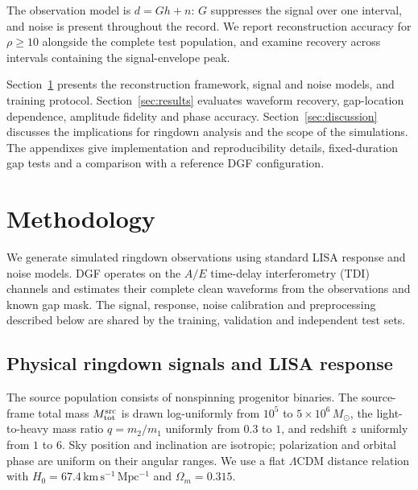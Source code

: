 \documentclass[10pt,prd,aps,a4paper,twocolumn,superscriptaddress,nofootinbib,floatfix]{revtex4-2}
\begin{document}
The observation model is $d=Gh+n$: $G$ suppresses the signal over one interval, and noise is present throughout the record. We report reconstruction accuracy for $\rho\ge10$ alongside the complete test population, and examine recovery across intervals containing the signal-envelope peak.

Section~\ref{sec:method} presents the reconstruction framework, signal and noise models, and training protocol. Section~\ref{sec:results} evaluates waveform recovery, gap-location dependence, amplitude fidelity and phase accuracy. Section~\ref{sec:discussion} discusses the implications for ringdown analysis and the scope of the simulations. The appendixes give implementation and reproducibility details, fixed-duration gap tests and a comparison with a reference DGF configuration.

\section{Methodology}\label{sec:method}
We generate simulated ringdown observations using standard LISA response and noise models. DGF operates on the $A/E$ time-delay interferometry (TDI) channels and estimates their complete clean waveforms from the observations and known gap mask. The signal, response, noise calibration and preprocessing described below are shared by the training, validation and independent test sets.

\subsection{Physical ringdown signals and LISA response}\label{sec:physical_signals}
The source population consists of nonspinning progenitor binaries. The source-frame total mass $M_{\rm tot}^{\rm src}$ is drawn log-uniformly from $10^5$ to $5\times10^6\,M_\odot$, the light-to-heavy mass ratio $q=m_2/m_1$ uniformly from $0.3$ to $1$, and redshift $z$ uniformly from $1$ to $6$. Sky position and inclination are isotropic; polarization and orbital phase are uniform on their angular ranges. We use a flat $\Lambda$CDM distance relation with $H_0=67.4\,\mathrm{km\,s^{-1}\,Mpc^{-1}}$ and $\Omega_m=0.315$.
\end{document}
